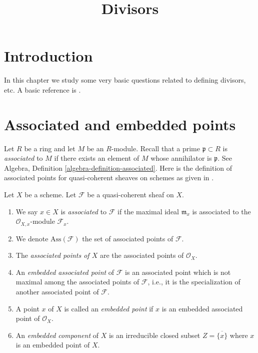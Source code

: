 

%


\title{Divisors}


\maketitle

\label{section-phantom}

\tableofcontents

\section{Introduction}
\label{section-introduction}

\noindent
In this chapter we study some very basic questions related
to defining divisors, etc. A basic reference is \cite{EGA}.



\section{Associated and embedded points}
\label{section-associated-embedded}

\noindent
Let $R$ be a ring and let $M$ be an $R$-module.
Recall that a prime $\mathfrak p \subset R$ is {\it associated} to $M$
if there exists an element of $M$ whose annihilator is $\mathfrak p$.
See Algebra, Definition \ref{algebra-definition-associated}.
Here is the definition of associated points
for quasi-coherent sheaves on schemes
as given in \cite[IV Definition 3.1.1]{EGA}.

\begin{definition}
\label{definition-associated-embedded}
Let $X$ be a scheme.
Let $\mathcal{F}$ be a quasi-coherent sheaf on $X$.
\begin{enumerate}
\item We say $x \in X$ is {\it associated} to $\mathcal{F}$
if the maximal ideal
$\mathfrak m_x$ is associated to the $\mathcal{O}_{X, x}$-module
$\mathcal{F}_x$.
\item We denote $\text{Ass}(\mathcal{F})$ the set of associated
points of $\mathcal{F}$.
\item The {\it associated points of $X$} are the associated
points of $\mathcal{O}_X$.
\item An {\it embedded associated point} of $\mathcal{F}$
is an associated point which is not maximal among the
associated points of $\mathcal{F}$, i.e., it is the specialization
of another associated point of $\mathcal{F}$.
\item A point $x$ of $X$ is called an {\it embedded point}
if $x$ is an embedded associated point of $\mathcal{O}_X$.
\item An {\it embedded component} of $X$ is an irreducible
closed subset $Z = \overline{\{x\}}$ where $x$ is an embedded
point of $X$.
\end{enumerate}
\end{definition}

